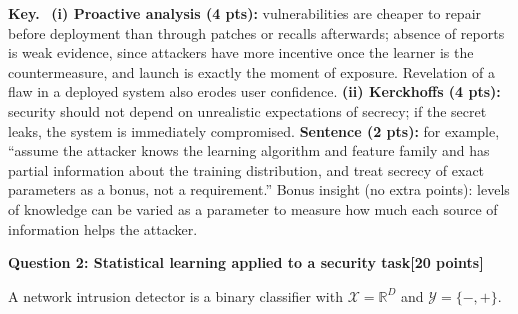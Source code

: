 \documentclass[10pt,a4paper]{extarticle}
\newcommand{\question}[3]{%
  \bigskip
  \begin{tcolorbox}[colback=navy!6, colframe=navy, boxrule=0.6pt, arc=1pt,
                    left=5pt, right=5pt, top=2pt, bottom=2pt]
    \textbf{\color{navy}Question #1: #2}\hfill\textbf{\color{accent}[#3 points]}
  \end{tcolorbox}\nopagebreak[4]}
\newenvironment{sol}{\par\smallskip
    \begin{tcolorbox}[colback=accent!6, colframe=accent, boxrule=0.5pt, arc=1pt,
                      left=5pt, right=5pt, top=2pt, bottom=2pt, breakable, fontupper=\small]
    \textbf{\color{accent}Key.}\ }{\end{tcolorbox}\par}
\begin{document}
\begin{enumerate}[label=(\alph*)]
\begin{sol}
\textbf{(i) Proactive analysis (4 pts):} vulnerabilities are cheaper to repair before deployment than through patches or recalls afterwards; absence of reports is weak evidence, since attackers have more incentive once the learner is the countermeasure, and launch is exactly the moment of exposure. Revelation of a flaw in a deployed system also erodes user confidence. \textbf{(ii) Kerckhoffs (4 pts):} security should not depend on unrealistic expectations of secrecy; if the secret leaks, the system is immediately compromised. \textbf{Sentence (2 pts):} for example, ``assume the attacker knows the learning algorithm and feature family and has partial information about the training distribution, and treat secrecy of exact parameters as a bonus, not a requirement.'' Bonus insight (no extra points): levels of knowledge can be varied as a parameter to measure how much each source of information helps the attacker.
\end{sol}
\end{enumerate}

\question{2}{Statistical learning applied to a security task}{20}

A network intrusion detector is a binary classifier with \(\mathcal X=\mathbb R^D\) and \(\mathcal Y=\{-,+\}\).
\end{document}
